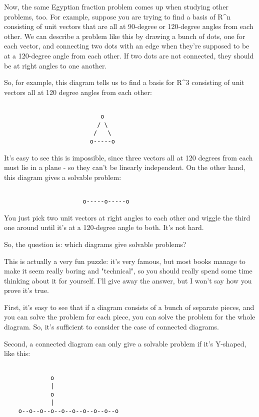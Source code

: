 Now, the same Egyptian fraction problem comes up when studying other
problems, too.  For example, suppose you are trying to find a basis of
R^{n} consisting of unit vectors that are all at 90-degree or 120-degree
angles from each other.  We can describe a problem like this by drawing
a bunch of dots, one for each vector, and connecting two dots with an
edge when they're supposed to be at a 120-degree angle from each other. 
If two dots are not connected, they should be at right angles to one
another.  

So, for example, this diagram tells us to find a basis for R^{3}
consisting of unit vectors all at 120 degree angles from each other:


\begin{verbatim}

                           o
                          / \
                         /   \
                        o-----o
\end{verbatim}
    
It's easy to see this is impossible, since three vectors all 
at 120 degrees from each must lie in a plane - so they can't be
linearly independent.  On the other hand, this diagram gives a
solvable problem:


\begin{verbatim}

                      o-----o-----o
\end{verbatim}
    
You just pick two unit vectors at right angles to each other and 
wiggle the third one around until it's at a 120-degree angle to both.
It's not hard.  

So, the question is: which diagrams give solvable problems?

This is actually a very fun puzzle: it's very famous, but most books
manage to make it seem really boring and "technical", so you should
really spend some time thinking about it for yourself.  I'll give away
the answer, but I won't say how you prove it's true.  

First, it's easy to see that if a diagram consists of a bunch of separate
pieces, and you can solve the problem for each piece, you can solve
the problem for the whole diagram.  So, it's sufficient to consider
the case of connected diagrams.  

Second, a connected diagram can only give a solvable problem if it's
Y-shaped, like this:


\begin{verbatim}

             o
             |
             o
             |
    o--o--o--o--o--o--o--o--o--o
\end{verbatim}
    
